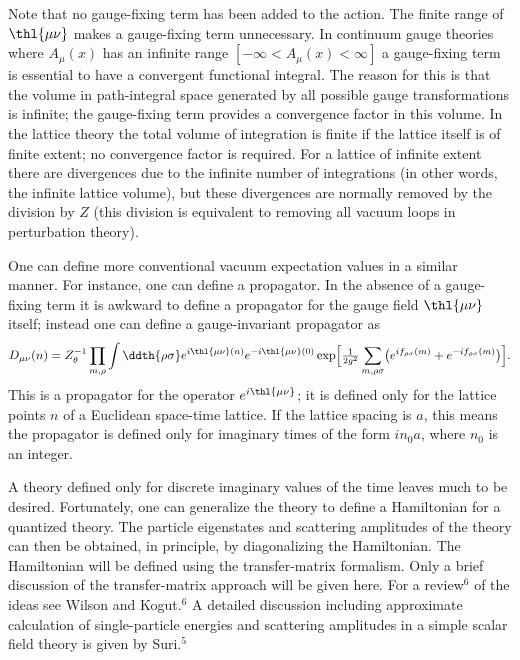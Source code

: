 Note that no gauge-fixing term has been added to the action.  The finite
range of $\thl{\mu\nu}$ makes a gauge-fixing term unnecessary.  In
continuum gauge theories where $A_{\mu}(x)$ has an infinite range
$[-\infty < A_{\mu}(x) < \infty]$ a gauge-fixing term is essential to
have a convergent functional integral.  The reason for this is that the
volume in path-integral space generated by all possible gauge
transformations is infinite; the gauge-fixing term provides a convergence
factor in this volume.  In the lattice theory the total volume of
integration is finite if the lattice itself is of finite extent; no
convergence factor is required.  For a lattice of infinite extent there
are divergences due to the infinite number of integrations (in other
words, the infinite lattice volume), but these divergences are normally
removed by the division by $Z$ (this division is equivalent to removing
all vacuum loops in perturbation theory).

One can define more conventional vacuum expectation values in a similar
manner.  For instance, one can define a propagator.  In the absence of a
gauge-fixing term it is awkward to define a propagator for the gauge
field $\thl{\mu\nu}$ itself; instead one can define a gauge-invariant
propagator as
\begin{equation}
D_{\mu\nu}(n) = Z_{\theta}^{-1}\prod_{m,\rho}\int\ddth{\rho\sigma}
  e^{i\thl{\mu\nu}(n)}e^{-i\thl{\mu\nu}(0)}
  \exp\!\Big[\tfrac{1}{2g^{2}}\sum_{m,\rho\sigma}
    \bigl(e^{if_{\rho\sigma}(m)}+e^{-if_{\rho\sigma}(m)}\bigr)\Big].
\label{eq:3.15}
\end{equation}
This is a propagator for the operator $e^{i\thl{\mu\nu}}$; it is defined
only for the lattice points $n$ of a Euclidean space-time lattice.  If
the lattice spacing is $a$, this means the propagator is defined only for
imaginary times of the form $in_{0}a$, where $n_{0}$ is an integer.

A theory defined only for discrete imaginary values of the time leaves
much to be desired.  Fortunately, one can generalize the theory to define
a Hamiltonian for a quantized theory.  The particle eigenstates and
scattering amplitudes of the theory can then be obtained, in principle,
by diagonalizing the Hamiltonian.  The Hamiltonian will be defined using
the transfer-matrix formalism.  Only a brief discussion of the
transfer-matrix approach will be given here.  For a review${}^{6}$ of the
ideas see Wilson and Kogut.${}^{6}$  A detailed discussion including
approximate calculation of single-particle energies and scattering
amplitudes in a simple scalar field theory is given by Suri.${}^{5}$

